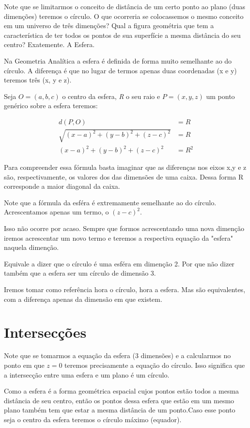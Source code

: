 Note que se limitarmos o conceito de distância de um certo ponto ao plano (duas dimenções) teremos o círculo. O que ocorreria se colocassemos o mesmo conceito em um universo de três dimenções? Qual a figura geométria que tem a característica de ter todos os pontos de sua superfície a mesma distância do seu centro? Exatemente. A Esfera.

Na Geometria Analítica a esfera é definida de forma muito semelhante ao do círculo. A diferença é que no lugar de termos apenas duas coordenadas (x e y) teremos três (x, y e z).

Seja $O=(a,b,c)$ o centro da esfera, \textit{R} o seu raio e $P=(x,y,z)$ um ponto genérico sobre a esfera teremos:

\begin{align*}
 d(P,O)&=R\\
 \sqrt{(x-a)^2+(y-b)^2+(z-c)^2}&=R\\
 (x-a)^2+(y-b)^2+(z-c)^2&=R^2
\end{align*}

Para compreender essa fórmula basta imaginar que as diferenças nos eixos x,y e z são, respectivamente, os valores dos das dimensões de uma caixa. Dessa forma R corresponde a maior diagonal da caixa.

Note que a fórmula da esféra é extremamente semelhante ao do círculo. Acrescentamos apenas um termo, o $(z-c)^2$.

Isso não ocorre por acaso. Sempre que formos acrescentando uma nova dimenção iremos acrescentar um novo termo e teremos a respectiva equação da "esfera" naquela dimenção.

Equivale a dizer que o círculo é uma esféra em dimenção 2. Por que não dizer também que a esfera ser um círculo de dimensão 3.

Iremos tomar como referência hora o círculo, hora a esfera. Mas são equivalentes, com a diferença apenas da dimensão em que existem.

\section{Intersecções}

Note que se tomarmos a equação da esfera (3 dimensões) e a calcularmos no ponto em que $z=0$ teremos precisamente a equação do círculo. Isso significa que a intersecção entre uma esfera e um plano é um círculo. 

Como a esfera é a forma geométrica espacial cujos pontos estão todos a mesma distância de seu centro, então os pontos dessa esfera que estão em um mesmo plano também tem que estar a mesma distância de um ponto.Caso esse ponto seja o centro da esfera teremos o círculo máximo (equador).

